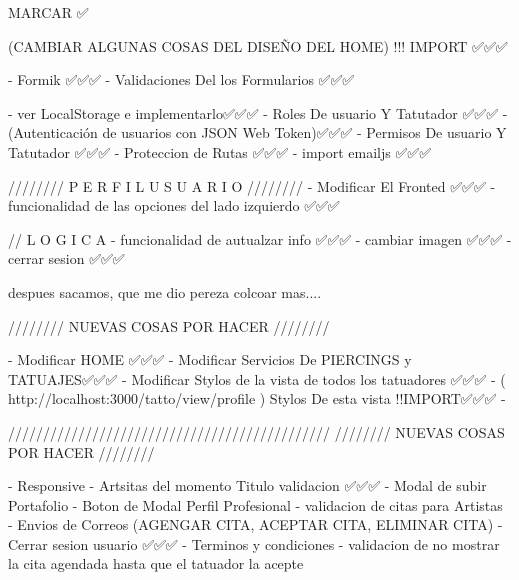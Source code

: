 
MARCAR ✅

(CAMBIAR ALGUNAS COSAS DEL DISEÑO DEL HOME) !!! IMPORT  ✅✅✅

    - Formik ✅✅✅
    - Validaciones Del los Formularios ✅✅✅

    - ver LocalStorage e implementarlo✅✅✅
    - Roles De usuario Y Tatutador ✅✅✅
    - (Autenticación de usuarios con JSON Web Token)✅✅✅
    - Permisos De usuario Y Tatutador ✅✅✅
    - Proteccion de Rutas ✅✅✅
    - import emailjs ✅✅✅



////////   P E R F I L   U S U A R I O   ////////  
    - Modificar El Fronted ✅✅✅
    - funcionalidad de las opciones del lado izquierdo ✅✅✅

    // L O G I C A
    - funcionalidad de autualzar info ✅✅✅
    - cambiar imagen ✅✅✅
    - cerrar sesion ✅✅✅

despues sacamos, que me dio pereza colcoar mas....

////////   NUEVAS COSAS POR HACER    ////////  

    - Modificar HOME ✅✅✅
    - Modificar Servicios De PIERCINGS y TATUAJES✅✅✅
    - Modificar Stylos de la vista de todos los tatuadores ✅✅✅
    - ( http://localhost:3000/tatto/view/profile )  Stylos De esta vista !!IMPORT✅✅✅
    -


//////////////////////////////////////////////
////////   NUEVAS COSAS POR HACER    //////// 

    - Responsive 
    - Artsitas del momento Titulo validacion ✅✅✅
    - Modal de subir Portafolio 
    - Boton de Modal Perfil Profesional
    - validacion de citas para Artistas
    - Envios de Correos (AGENGAR CITA,  ACEPTAR CITA, ELIMINAR CITA)
    - Cerrar sesion usuario ✅✅✅
    - Terminos y condiciones 
    - validacion de no mostrar la cita agendada hasta que el tatuador la acepte 






